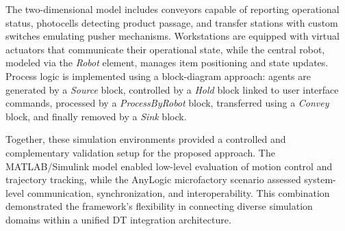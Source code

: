 
The two-dimensional model includes conveyors capable of reporting operational status, photocells detecting product passage, and transfer stations with custom switches emulating pusher mechanisms. Workstations are equipped with virtual actuators that communicate their operational state, while the central robot, modeled via the \textit{Robot} element, manages item positioning and state updates. Process logic is implemented using a block-diagram approach: agents are generated by a \textit{Source} block, controlled by a \textit{Hold} block linked to user interface commands, processed by a \textit{ProcessByRobot} block, transferred using a \textit{Convey} block, and finally removed by a \textit{Sink} block. 

Together, these simulation environments provided a controlled and complementary validation setup for the proposed approach. The MATLAB/Simulink model enabled low-level evaluation of motion control and trajectory tracking, while the AnyLogic microfactory scenario assessed system-level communication, synchronization, and interoperability. This combination demonstrated the framework’s flexibility in connecting diverse simulation domains within a unified DT integration architecture.






